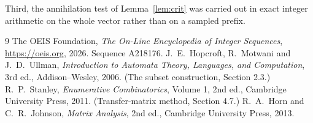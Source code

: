 \documentclass[11pt,a4paper]{article}
\theoremstyle{plain}
\theoremstyle{definition}
\begin{document}
Third, the annihilation test of Lemma~\ref{lem:crit} was carried out in exact integer
arithmetic on the whole vector rather than on a sampled prefix.

\begin{thebibliography}{9}
 The OEIS Foundation, \emph{The On-Line Encyclopedia of Integer
Sequences}, \url{https://oeis.org}, 2026. Sequence A218176.
 J.~E.~Hopcroft, R.~Motwani and J.~D.~Ullman, \emph{Introduction to Automata
Theory, Languages, and Computation}, 3rd ed., Addison--Wesley, 2006. (The subset
construction, Section 2.3.)
 R.~P.~Stanley, \emph{Enumerative Combinatorics}, Volume 1, 2nd ed.,
Cambridge University Press, 2011. (Transfer-matrix method, Section 4.7.)
 R.~A.~Horn and C.~R.~Johnson, \emph{Matrix Analysis}, 2nd ed., Cambridge
University Press, 2013.
\end{thebibliography}
\end{document}
